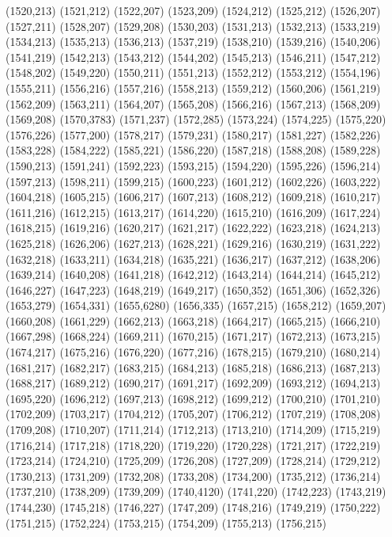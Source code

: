 (1520,213)
(1521,212)
(1522,207)
(1523,209)
(1524,212)
(1525,212)
(1526,207)
(1527,211)
(1528,207)
(1529,208)
(1530,203)
(1531,213)
(1532,213)
(1533,219)
(1534,213)
(1535,213)
(1536,213)
(1537,219)
(1538,210)
(1539,216)
(1540,206)
(1541,219)
(1542,213)
(1543,212)
(1544,202)
(1545,213)
(1546,211)
(1547,212)
(1548,202)
(1549,220)
(1550,211)
(1551,213)
(1552,212)
(1553,212)
(1554,196)
(1555,211)
(1556,216)
(1557,216)
(1558,213)
(1559,212)
(1560,206)
(1561,219)
(1562,209)
(1563,211)
(1564,207)
(1565,208)
(1566,216)
(1567,213)
(1568,209)
(1569,208)
(1570,3783)
(1571,237)
(1572,285)
(1573,224)
(1574,225)
(1575,220)
(1576,226)
(1577,200)
(1578,217)
(1579,231)
(1580,217)
(1581,227)
(1582,226)
(1583,228)
(1584,222)
(1585,221)
(1586,220)
(1587,218)
(1588,208)
(1589,228)
(1590,213)
(1591,241)
(1592,223)
(1593,215)
(1594,220)
(1595,226)
(1596,214)
(1597,213)
(1598,211)
(1599,215)
(1600,223)
(1601,212)
(1602,226)
(1603,222)
(1604,218)
(1605,215)
(1606,217)
(1607,213)
(1608,212)
(1609,218)
(1610,217)
(1611,216)
(1612,215)
(1613,217)
(1614,220)
(1615,210)
(1616,209)
(1617,224)
(1618,215)
(1619,216)
(1620,217)
(1621,217)
(1622,222)
(1623,218)
(1624,213)
(1625,218)
(1626,206)
(1627,213)
(1628,221)
(1629,216)
(1630,219)
(1631,222)
(1632,218)
(1633,211)
(1634,218)
(1635,221)
(1636,217)
(1637,212)
(1638,206)
(1639,214)
(1640,208)
(1641,218)
(1642,212)
(1643,214)
(1644,214)
(1645,212)
(1646,227)
(1647,223)
(1648,219)
(1649,217)
(1650,352)
(1651,306)
(1652,326)
(1653,279)
(1654,331)
(1655,6280)
(1656,335)
(1657,215)
(1658,212)
(1659,207)
(1660,208)
(1661,229)
(1662,213)
(1663,218)
(1664,217)
(1665,215)
(1666,210)
(1667,298)
(1668,224)
(1669,211)
(1670,215)
(1671,217)
(1672,213)
(1673,215)
(1674,217)
(1675,216)
(1676,220)
(1677,216)
(1678,215)
(1679,210)
(1680,214)
(1681,217)
(1682,217)
(1683,215)
(1684,213)
(1685,218)
(1686,213)
(1687,213)
(1688,217)
(1689,212)
(1690,217)
(1691,217)
(1692,209)
(1693,212)
(1694,213)
(1695,220)
(1696,212)
(1697,213)
(1698,212)
(1699,212)
(1700,210)
(1701,210)
(1702,209)
(1703,217)
(1704,212)
(1705,207)
(1706,212)
(1707,219)
(1708,208)
(1709,208)
(1710,207)
(1711,214)
(1712,213)
(1713,210)
(1714,209)
(1715,219)
(1716,214)
(1717,218)
(1718,220)
(1719,220)
(1720,228)
(1721,217)
(1722,219)
(1723,214)
(1724,210)
(1725,209)
(1726,208)
(1727,209)
(1728,214)
(1729,212)
(1730,213)
(1731,209)
(1732,208)
(1733,208)
(1734,200)
(1735,212)
(1736,214)
(1737,210)
(1738,209)
(1739,209)
(1740,4120)
(1741,220)
(1742,223)
(1743,219)
(1744,230)
(1745,218)
(1746,227)
(1747,209)
(1748,216)
(1749,219)
(1750,222)
(1751,215)
(1752,224)
(1753,215)
(1754,209)
(1755,213)
(1756,215)
